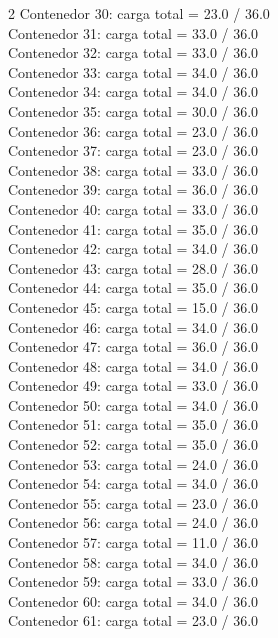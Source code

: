 \begin{multicols}{2}
Contenedor 30: carga total = 23.0 / 36.0\\
Contenedor 31: carga total = 33.0 / 36.0\\
Contenedor 32: carga total = 33.0 / 36.0\\
Contenedor 33: carga total = 34.0 / 36.0\\
Contenedor 34: carga total = 34.0 / 36.0\\
Contenedor 35: carga total = 30.0 / 36.0\\
Contenedor 36: carga total = 23.0 / 36.0\\
Contenedor 37: carga total = 23.0 / 36.0\\
Contenedor 38: carga total = 33.0 / 36.0\\
Contenedor 39: carga total = 36.0 / 36.0\\
Contenedor 40: carga total = 33.0 / 36.0\\
Contenedor 41: carga total = 35.0 / 36.0\\
Contenedor 42: carga total = 34.0 / 36.0\\
Contenedor 43: carga total = 28.0 / 36.0\\
Contenedor 44: carga total = 35.0 / 36.0\\
Contenedor 45: carga total = 15.0 / 36.0\\
Contenedor 46: carga total = 34.0 / 36.0\\
Contenedor 47: carga total = 36.0 / 36.0\\
Contenedor 48: carga total = 34.0 / 36.0\\
Contenedor 49: carga total = 33.0 / 36.0\\
Contenedor 50: carga total = 34.0 / 36.0\\
Contenedor 51: carga total = 35.0 / 36.0\\
Contenedor 52: carga total = 35.0 / 36.0\\
Contenedor 53: carga total = 24.0 / 36.0\\
Contenedor 54: carga total = 34.0 / 36.0\\
Contenedor 55: carga total = 23.0 / 36.0\\
Contenedor 56: carga total = 24.0 / 36.0\\
Contenedor 57: carga total = 11.0 / 36.0\\
Contenedor 58: carga total = 34.0 / 36.0\\
Contenedor 59: carga total = 33.0 / 36.0\\
Contenedor 60: carga total = 34.0 / 36.0\\
Contenedor 61: carga total = 23.0 / 36.0\\

\end{multicols}
